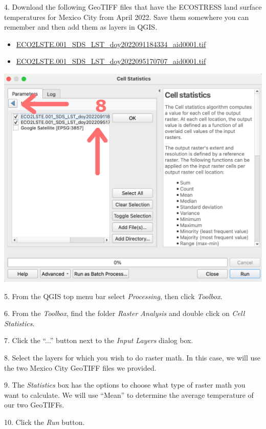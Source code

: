 \documentclass[oneside,a4paper,11pt,explicit]{book}
\begin{document}
4. Download the following GeoTIFF files that have the ECOSTRESS land surface temperatures for Mexico City from April 2022. Save them somewhere you can remember and then add them as layers in QGIS. 

\begin{itemize}
    \item \href{https://jeremydforsythe.github.io/icecream-tutorials/Tutorial11_RasterCalculator/ECO2LSTE.001_SDS_LST_doy2022091184334_aid0001.tif}{\small ECO2LSTE.001\_SDS\_LST\_doy2022091184334\_aid0001.tif}
    \item \href{https://jeremydforsythe.github.io/icecream-tutorials/Tutorial11_RasterCalculator/ECO2LSTE.001_SDS_LST_doy2022095170707_aid0001.tif}{\small ECO2LSTE.001\_SDS\_LST\_doy2022095170707\_aid0001.tif}
\end{itemize}

\vspace{.5em}

\centerline{\includegraphics[width=.45\textwidth]{CellSelect.png}}

\vspace{.5em}

5. From the QGIS top menu bar select \textit{Processing}, then click \textit{Toolbox}.

6. From the \textit{Toolbox}, find the folder \textit{Raster Analysis} and double click on \textit{Cell Statistics}.

7. Click the ``...'' button next to the \textit{Input Layers} dialog box. 

8. Select the layers for which you wish to do raster math. In this case, we will use the two Mexico City GeoTIFF files we provided.

9. The \textit{Statistics} box has the options to choose what type of raster math you want to calculate. We will use ``Mean'' to determine the average temperature of our two GeoTIFFs. 

10. Click the \textit{Run} button.

\vspace{.5em}
\end{document}
